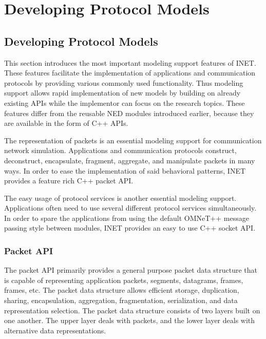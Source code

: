 \chapter{Developing Protocol Models}
\label{cha:developing-protocol-models}

\section{Developing Protocol Models}
\label{sec:developing-protocol-models}

This section introduces the most important modeling support features of
INET. These features facilitate the implementation of applications and
communication protocols by providing various commonly used functionality.
Thus modeling support allows rapid implementation of new models by building
on already existing APIs while the implementor can focus on the research
topics. These features differ from the reusable NED modules introduced
earlier, because they are available in the form of C++ APIs.

The representation of packets is an essential modeling support for
communication network simulation. Applications and communication protocols
construct, deconstruct, encapsulate, fragment, aggregate, and manipulate
packets in many ways. In order to ease the implementation of said
behavioral patterns, INET provides a feature rich C++ packet API.

The easy usage of protocol services is another essential modeling support.
Applications often need to use several different protocol services
simultaneously. In order to spare the applications from using the default
OMNeT++ message passing style between modules, INET provides an easy to use
C++ socket API.

\subsection{Packet API}
\label{subsec:packet-api}

The packet API primarily provides a general purpose packet data structure
that is capable of representing application packets, 
segments,  datagrams,  frames,
 frames, etc. The packet data structure allows
efficient storage, duplication, sharing, encapsulation, aggregation,
fragmentation, serialization, and data representation selection. The packet
data structure consists of two layers built on one another. The upper layer
deals with packets, and the lower layer deals with alternative data
representations.

